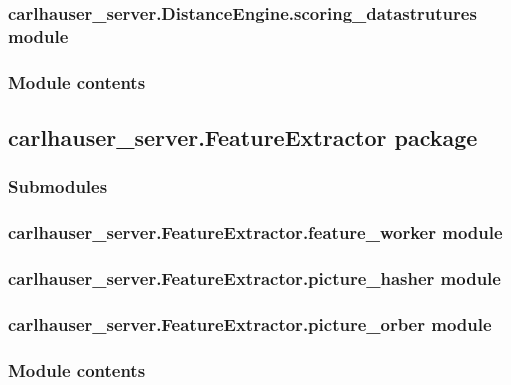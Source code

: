 \documentclass[letterpaper,10pt,english]{sphinxmanual}
\begin{document}
\subsubsection{carlhauser\_server.DistanceEngine.scoring\_datastrutures module}
\label{\detokenize{carlhauser_server.DistanceEngine:carlhauser-server-distanceengine-scoring-datastrutures-module}}

\subsubsection{Module contents}
\label{\detokenize{carlhauser_server.DistanceEngine:module-contents}}

\subsection{carlhauser\_server.FeatureExtractor package}
\label{\detokenize{carlhauser_server.FeatureExtractor:carlhauser-server-featureextractor-package}}\label{\detokenize{carlhauser_server.FeatureExtractor::doc}}

\subsubsection{Submodules}
\label{\detokenize{carlhauser_server.FeatureExtractor:submodules}}

\subsubsection{carlhauser\_server.FeatureExtractor.feature\_worker module}
\label{\detokenize{carlhauser_server.FeatureExtractor:carlhauser-server-featureextractor-feature-worker-module}}

\subsubsection{carlhauser\_server.FeatureExtractor.picture\_hasher module}
\label{\detokenize{carlhauser_server.FeatureExtractor:carlhauser-server-featureextractor-picture-hasher-module}}

\subsubsection{carlhauser\_server.FeatureExtractor.picture\_orber module}
\label{\detokenize{carlhauser_server.FeatureExtractor:carlhauser-server-featureextractor-picture-orber-module}}

\subsubsection{Module contents}
\label{\detokenize{carlhauser_server.FeatureExtractor:module-contents}}
\end{document}
